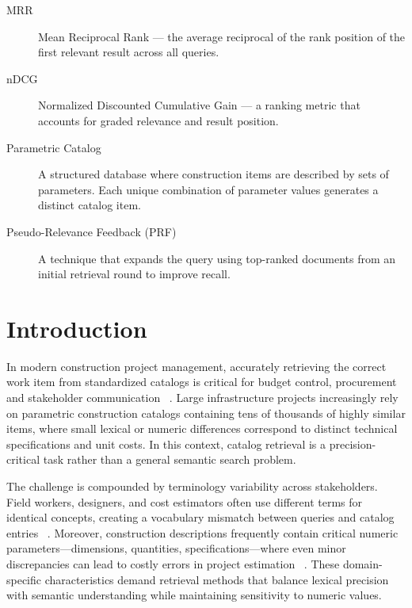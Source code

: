 \documentclass[preprint,12pt]{elsarticle}
\begin{document}
\begin{description}
    \item[MRR] Mean Reciprocal Rank — the average reciprocal of the rank position of the first relevant result across all queries.
    
    \item[nDCG] Normalized Discounted Cumulative Gain --- a ranking metric that accounts for graded relevance and result position.

    \item[Parametric Catalog] A structured database where construction items are described by sets of parameters.  Each unique combination of parameter values generates a distinct catalog item.
    
    \item[Pseudo-Relevance Feedback (PRF)] A technique that expands the query using top-ranked documents from an initial retrieval round to improve recall.

\end{description}

\section{Introduction}
In modern construction project management, accurately retrieving the correct work item from standardized catalogs  is critical for budget control, procurement and stakeholder communication ~\cite{martinez-rojasApproachAutomaticClassification2015, natural_wu_2022}. Large infrastructure projects increasingly rely on parametric construction catalogs containing tens of thousands of highly similar items, where small lexical or numeric differences correspond to distinct technical specifications and unit costs. In this context, catalog retrieval is a precision-critical task rather than a general semantic search problem.

The challenge is compounded by terminology variability across stakeholders. Field workers, designers, and cost estimators often use different terms for identical concepts, creating a vocabulary mismatch between queries and catalog entries  ~\cite{chungComparingNaturalLanguage2023, role_martnezrojas_2016, rampiniArtificialIntelligenceConstruction2022, casiniAdvancedSiteManagement2022}. Moreover, construction descriptions frequently contain critical numeric parameters—dimensions, quantities, specifications—where even minor discrepancies can lead to costly errors in project estimation ~\cite{natural_wu_2022}. These domain-specific characteristics demand retrieval methods that balance lexical precision with semantic understanding while maintaining sensitivity to numeric values.
\end{document}
